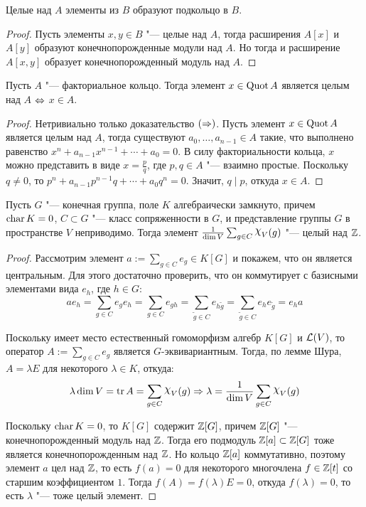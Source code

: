 \begin{corollary}
	Целые над $A$ элементы из $B$ образуют подкольцо в $B$.
\end{corollary}

\begin{proof}
	Пусть элементы $x, y \in B$ "--- целые над $A$, тогда расширения $A[x]$ и $A[y]$ образуют конечнопорожденные модули над $A$. Но тогда и расширение $A[x, y]$ образует конечнопорожденный модуль над $A$.
\end{proof}

\begin{proposition}
	Пусть $A$ "--- факториальное кольцо. Тогда элемент $x \in \operatorname{Quot}{A}$ является целым над $A$ $\Leftrightarrow$ $x \in A$.
\end{proposition}

\begin{proof}
	Нетривиально только доказательство $(\Rightarrow)$. Пусть элемент $x \in \operatorname{Quot}{A}$ является целым над $A$, тогда существуют $a_0, \dotsc, a_{n-1} \in A$ такие, что выполнено равенство $x^n + a_{n-1}x^{n-1} + \dotsb + a_0 = 0$. В силу факториальности кольца, $x$ можно представить в виде $x = \frac pq$, где $p, q \in A$ "--- взаимно простые. Поскольку $q \ne 0$, то $p^n + a_{n-1}{p^{n- 1}}q + \dotsb + a_0q^n = 0$. Значит, $q \mid p$, откуда $x \in A$.
\end{proof}

\begin{proposition}
	Пусть $G$ "--- конечная группа, поле $K$ алгебраически замкнуто, причем $\operatorname{char}{K} = 0$, $C \subset G$ "--- класс сопряженности в $G$, и представление группы $G$ в пространстве $V$ неприводимо. Тогда элемент $\frac1{\dim{V}}\sum_{g \in C}\Chi_V(g)$ "--- целый над $\mathbb{Z}$.
\end{proposition}

\begin{proof}
	Рассмотрим элемент $a := \sum_{g \in C}e_g \in K[G]$ и покажем, что он является центральным. Для этого достаточно проверить, что он коммутирует с базисными элементами вида $e_h$, где $h \in G$:
	\[ae_h = \sum_{g \in C}e_ge_h = \sum_{g \in C}e_{gh} = \sum_{\widetilde g \in C}e_{h\widetilde g} = \sum_{\widetilde g \in C}e_{h}e_{\widetilde g} = e_ha\]
	
	Поскольку имеет место естественный гомоморфизм алгебр $K[G]$ и $\mathcal L(V)$, то оператор $A := \sum_{g \in C}{e_g}$ является $G$-эквивариантным. Тогда, по лемме Шура, $A = \lambda E$ для некоторого $\lambda \in K$, откуда:
	\[\lambda\dim{V} = \tr{A} = \sum_{g \in C}\Chi_V(g) \ra \lambda = \frac1{\dim{V}}\sum_{g \in C}\Chi_V(g)\]
	
	Поскольку $\operatorname{char}{K} = 0$, то $K[G]$ содержит $\mathbb{Z}[G]$, причем $\mathbb{Z}[G]$ "--- конечнопорожденный модуль над $\mathbb{Z}$. Тогда его подмодуль $\mathbb{Z}[a] \subset \mathbb{Z}[G]$ тоже является конечнопорожденным над $\mathbb{Z}$. Но кольцо $\mathbb{Z}[a]$ коммутативно, поэтому элемент $a$ цел над $\mathbb{Z}$, то есть $f(a) = 0$ для некоторого многочлена $f \in \mathbb{Z}[t]$ со старшим коэффициентом $1$. Тогда $f(A) = f(\lambda)E = 0$, откуда $f(\lambda) = 0$, то есть $\lambda$ "--- тоже целый элемент.
\end{proof}

